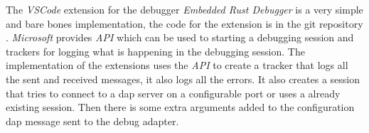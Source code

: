 The \emph{VSCode} extension for the debugger \emph{Embedded Rust Debugger} is a very simple and bare bones implementation, the code for the extension is in the git repository \cite{erd-vscode}.
\emph{Microsoft} provides \emph{API} which can be used to starting a debugging session and trackers for logging what is happening in the debugging session.
The implementation of the extensions uses the \emph{API} to create a tracker that logs all the sent and received messages, it also logs all the errors.
It also creates a session that tries to connect to a \acrshort{dap} server on a configurable port or uses a already existing session.
Then there is some extra arguments added to the configuration \acrshort{dap} message sent to the debug adapter.

